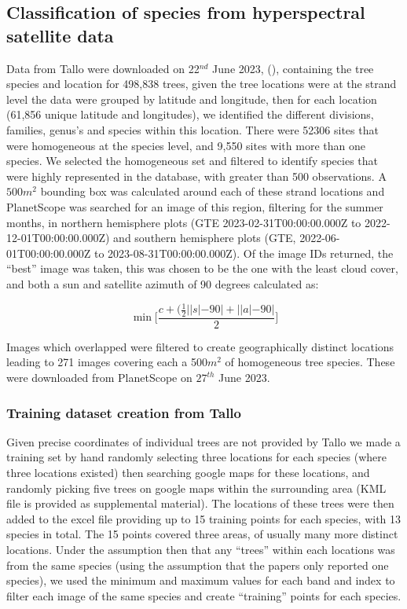\documentclass[9pt,lineno]{elife}
\begin{document}
\subsection{Classification of species from hyperspectral satellite data}
Data from Tallo were downloaded on 22$^{nd}$ June 2023, (\cite{Jucker_Fischer_Chave_Coomes_Caspersen_Ali_Loubota_2022}), containing the tree species and location for 498,838 trees, given the tree locations were at the strand level the data were grouped by latitude and longitude, then for each location (61,856 unique latitude and longitudes), we identified the different divisions, families, genus's and species within this location. There were 52306 sites that were homogeneous at the species level, and 9,550 sites with more than one species. We selected the homogeneous set and filtered to identify species that were highly represented in the database, with greater than 500 observations. A $500m^2$ bounding box was calculated around each of these strand locations and PlanetScope was searched for an image of this region, filtering for the summer months, in northern hemisphere plots (GTE 2023-02-31T00:00:00.000Z to 2022-12-01T00:00:00.000Z) and southern hemisphere plots (GTE, 2022-06-01T00:00:00.000Z to 2023-08-31T00:00:00.000Z). Of the image IDs returned, the ``best'' image was taken, this was chosen to be the one with the least cloud cover, and both a sun and satellite azimuth of 90 degrees calculated as:

\begin{equation}
\min\big[\frac{c + (\frac{1}{2}||s| - 90| + ||a|-90|}{2}\big]
\end{equation}

Images which overlapped were filtered to create geographically distinct locations leading to 271 images covering each a 500$m^2$ of homogeneous tree species. These were downloaded from PlanetScope on $27^{th}$ June 2023.

\subsubsection{Training dataset creation from Tallo}
Given precise coordinates of individual trees are not provided by Tallo we made a training set by hand randomly selecting three locations for each species (where three locations existed) then searching google maps for these locations, and randomly picking five trees on google maps within the surrounding area (KML file is provided as supplemental material). The locations of these trees were then added to the excel file providing up to 15 training points for each species, with 13 species in total. The 15 points covered three areas, of usually many more distinct locations. Under the assumption then that any ``trees'' within each locations was from the same species (using the assumption that the papers only reported one species), we used the minimum and maximum values for each band and index to filter each image of the same species and create ``training'' points for each species.
\end{document}

